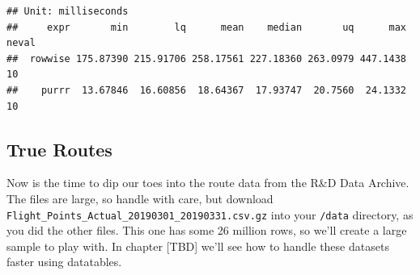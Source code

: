 \documentclass[
]{book}
\newenvironment{Shaded}{\begin{snugshade}}{\end{snugshade}}
\newcommand{\AttributeTok}[1]{\textcolor[rgb]{0.77,0.63,0.00}{#1}}
\newcommand{\CommentTok}[1]{\textcolor[rgb]{0.56,0.35,0.01}{\textit{#1}}}
\newcommand{\DecValTok}[1]{\textcolor[rgb]{0.00,0.00,0.81}{#1}}
\newcommand{\FunctionTok}[1]{\textcolor[rgb]{0.00,0.00,0.00}{#1}}
\newcommand{\NormalTok}[1]{#1}
\newcommand{\OtherTok}[1]{\textcolor[rgb]{0.56,0.35,0.01}{#1}}
\newcommand{\SpecialCharTok}[1]{\textcolor[rgb]{0.00,0.00,0.00}{#1}}
\newcommand{\StringTok}[1]{\textcolor[rgb]{0.31,0.60,0.02}{#1}}
\begin{document}
\begin{verbatim}
## Unit: milliseconds
##     expr       min        lq      mean    median       uq      max neval
##  rowwise 175.87390 215.91706 258.17561 227.18360 263.0979 447.1438    10
##    purrr  13.67846  16.60856  18.64367  17.93747  20.7560  24.1332    10
\end{verbatim}

\hypertarget{trueRoutes}{%
\subsection{True Routes}\label{trueRoutes}}

Now is the time to dip our toes into the route data from the R\&D Data Archive. The files are large, so handle with care, but download \texttt{Flight\_Points\_Actual\_20190301\_20190331.csv.gz} into your \texttt{/data} directory, as you did the other files. This one has some 26 million rows, so we'll create a large sample to play with. In chapter {[}TBD{]} we'll see how to handle these datasets faster using datatables.

\begin{Shaded}
\end{Shaded}
\end{document}
